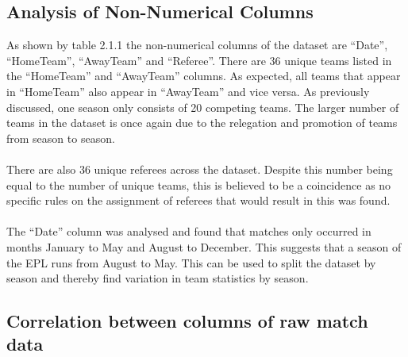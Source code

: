 \documentclass[a4paper,12pt]{article}
\begin{document}
	\subsection{Analysis of Non-Numerical Columns}
		
		As shown by table 2.1.1 the non-numerical columns of the dataset are “Date”, “HomeTeam”, “AwayTeam” and “Referee”. There are 36 unique teams listed in the “HomeTeam” and “AwayTeam” columns. As expected, all teams that appear in “HomeTeam” also appear in “AwayTeam” and vice versa. As previously discussed, one season only consists of 20 competing teams. The larger number of teams in the dataset is once again due to the relegation and promotion of teams from season to season.\\
		\\
		There are also 36 unique referees across the dataset. Despite this number being equal to the number of unique teams, this is believed to be a coincidence as no specific rules on the assignment of referees that would result in this was found.\\
		\\
		The “Date” column was analysed and found that matches only occurred in months January to May and August to December. This suggests that a season of the EPL runs from August to May. This can be used to split the dataset by season and thereby find variation in team statistics by season.  
	
	\subsection{Correlation between columns of raw match data }
	
\end{document}
